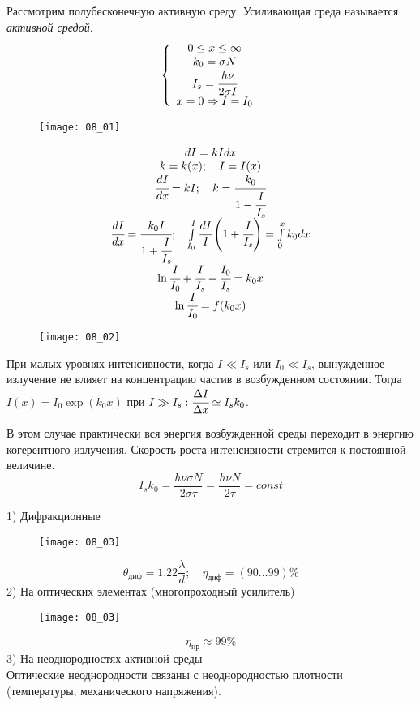 

Рассмотрим полубесконечную активную среду. Усиливающая среда называется
\emph{активной средой}.
\[
    \left\{ \begin{array}{c}
        0 \leq x \leq \infty \\
        k_0 = \sigma N \\
        I_s = \cfrac{h\nu}{2\sigma I} \\
        x = 0 \Rightarrow I = I_0
    \end{array} \right.
\]

\begin{figure}[h!]
    \center
    \texttt{[image: 08\_01]}
\end{figure}

\[
    \begin{array}{c}
        dI = kI dx \\
        k = k(x); \quad I = I(x) \\
        \cfrac{dI}{dx} = kI; \quad k = \cfrac{k_0}{1-\cfrac{I}{I_s}} \\
        \cfrac{dI}{dx} = \cfrac{k_0 I}{1+\cfrac{I}{I_s}}; \quad
            \int\limits_{I_0}^{I} \cfrac{dI}{I}
            \left( 1 + \cfrac{I}{I_s} \right) = \int\limits_{0}^{x} k_0 dx \\
        \ln\cfrac{I}{I_0} + \cfrac{I}{I_s} - \cfrac{I_0}{I_s} = k_0 x \\
        \ln\cfrac{I}{I_0} = f(k_0 x)
    \end{array}
\]

\begin{figure}[h!]
    \center
    \texttt{[image: 08\_02]}
\end{figure}

При малых уровнях интенсивности, когда \( I \ll I_s \) или \( I_0 \ll I_s \),
вынужденное излучение не влияет на концентрацию частив в возбужденном
состоянии. Тогда \( I(x) = I_0\exp(k_0 x) \) при
\( I \gg I_s: \cfrac{\Delta I}{\Delta x} \simeq I_s k_0 \).

В этом случае практически вся энергия возбужденной среды переходит в энергию
когерентного излучения. Скорость роста интенсивности стремится к постоянной
величине.
\[
    I_s k_0 = \frac{h\nu\sigma N}{2\sigma\tau} = \frac{h\nu N}{2\tau} = const
\]


1) Дифракционные
\begin{figure}[h!]
    \center
    \texttt{[image: 08\_03]}
\end{figure}
\[
    \theta_\text{диф} = 1.22\frac{\lambda}{d};\quad
    \eta_\text{диф} = (90\ldots99)\%
\]
2) На оптических элементах (многопроходный усилитель)
\begin{figure}[h!]
    \center
    \texttt{[image: 08\_03]}
\end{figure}
\[
    \eta_\text{нр} \approx 99\%
\]
3) На неоднородностях активной среды \\
Оптические неоднородности связаны с неоднородностью плотности (температуры,
механического напряжения).
